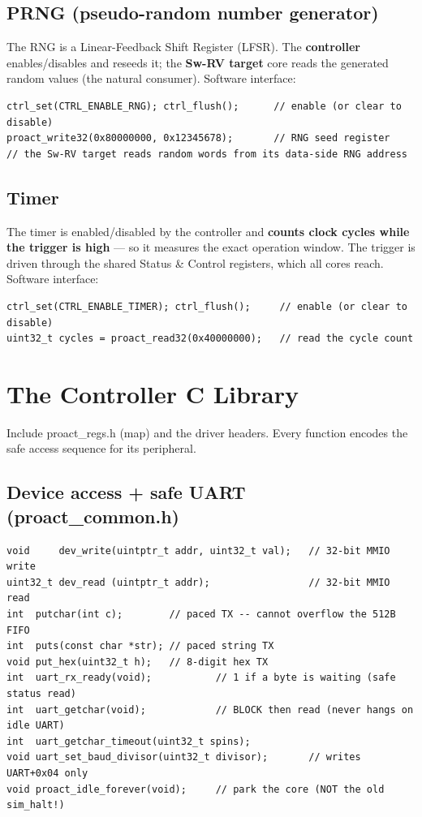 \documentclass[11pt,a4paper]{report}
\newcommand{\code}[1]{{\ttfamily\small #1}}
\begin{document}
\section{PRNG (pseudo-random number generator)}
The RNG is a Linear-Feedback Shift Register (LFSR). The \textbf{controller}
enables/disables and reseeds it; the \textbf{Sw-RV target} core reads the
generated random values (the natural consumer). Software interface:
\begin{lstlisting}[style=c]
ctrl_set(CTRL_ENABLE_RNG); ctrl_flush();      // enable (or clear to disable)
proact_write32(0x80000000, 0x12345678);       // RNG seed register
// the Sw-RV target reads random words from its data-side RNG address
\end{lstlisting}

\section{Timer}
The timer is enabled/disabled by the controller and \textbf{counts clock cycles
while the trigger is high} --- so it measures the exact operation window. The
trigger is driven through the shared Status \& Control registers, which all cores
reach. Software interface:
\begin{lstlisting}[style=c]
ctrl_set(CTRL_ENABLE_TIMER); ctrl_flush();     // enable (or clear to disable)
uint32_t cycles = proact_read32(0x40000000);   // read the cycle count
\end{lstlisting}

\chapter{The Controller C Library}
Include \code{proact\_regs.h} (map) and the driver headers. Every function
encodes the safe access sequence for its peripheral.

\section{Device access + safe UART (\code{proact\_common.h})}
\begin{lstlisting}[style=c]
void     dev_write(uintptr_t addr, uint32_t val);   // 32-bit MMIO write
uint32_t dev_read (uintptr_t addr);                 // 32-bit MMIO read
int  putchar(int c);        // paced TX -- cannot overflow the 512B FIFO
int  puts(const char *str); // paced string TX
void put_hex(uint32_t h);   // 8-digit hex TX
int  uart_rx_ready(void);           // 1 if a byte is waiting (safe status read)
int  uart_getchar(void);            // BLOCK then read (never hangs on idle UART)
int  uart_getchar_timeout(uint32_t spins);
void uart_set_baud_divisor(uint32_t divisor);       // writes UART+0x04 only
void proact_idle_forever(void);     // park the core (NOT the old sim_halt!)
\end{lstlisting}
\end{document}
